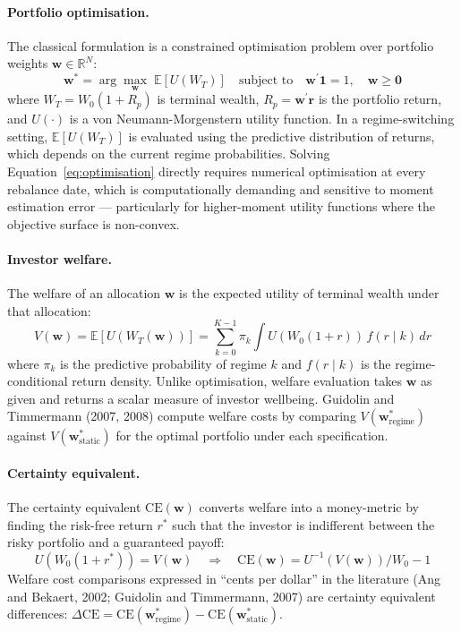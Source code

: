 \documentclass[12pt, a4paper]{article}
\begin{document}
\paragraph*{Portfolio optimisation.}
The classical formulation is a constrained optimisation problem over portfolio weights
$\mathbf{w} \in \mathbb{R}^N$:
\begin{equation}
  \mathbf{w}^* = \arg\max_{\mathbf{w}} \;\mathbb{E}\!\left[U(W_T)\right]
  \quad \text{subject to} \quad
  \mathbf{w}^\prime \mathbf{1} = 1, \quad \mathbf{w} \geq \mathbf{0}
  \label{eq:optimisation}
\end{equation}
where $W_T = W_0(1 + R_p)$ is terminal wealth, $R_p = \mathbf{w}^\prime \mathbf{r}$ is the
portfolio return, and $U(\cdot)$ is a von Neumann-Morgenstern utility function. In a
regime-switching setting, $\mathbb{E}[U(W_T)]$ is evaluated using the predictive distribution
of returns, which depends on the current regime probabilities. Solving
Equation~\eqref{eq:optimisation} directly requires numerical optimisation at every rebalance
date, which is computationally demanding and sensitive to moment estimation error --- particularly
for higher-moment utility functions where the objective surface is non-convex.

\paragraph*{Investor welfare.}
The welfare of an allocation $\mathbf{w}$ is the expected utility of terminal wealth under
that allocation:
\begin{equation}
  V(\mathbf{w}) = \mathbb{E}\!\left[U(W_T(\mathbf{w}))\right]
               = \sum_{k=0}^{K-1} \pi_k \int U(W_0(1+r))\, f(r \mid k)\, dr
  \label{eq:welfare}
\end{equation}
where $\pi_k$ is the predictive probability of regime $k$ and $f(r \mid k)$ is the
regime-conditional return density. Unlike optimisation, welfare evaluation takes $\mathbf{w}$
as given and returns a scalar measure of investor wellbeing. Guidolin and Timmermann (2007,
2008) compute welfare costs by comparing $V(\mathbf{w}^*_{\text{regime}})$ against
$V(\mathbf{w}^*_{\text{static}})$ for the optimal portfolio under each specification.

\paragraph*{Certainty equivalent.}
The certainty equivalent $\text{CE}(\mathbf{w})$ converts welfare into a money-metric
by finding the risk-free return $r^*$ such that the investor is indifferent between the
risky portfolio and a guaranteed payoff:
\begin{equation}
  U\!\left(W_0(1 + r^*)\right) = V(\mathbf{w})
  \quad\Longrightarrow\quad
  \text{CE}(\mathbf{w}) = U^{-1}\!\left(V(\mathbf{w})\right) / W_0 - 1
  \label{eq:ce}
\end{equation}
Welfare cost comparisons expressed in ``cents per dollar'' in the literature (Ang and
Bekaert, 2002; Guidolin and Timmermann, 2007) are certainty equivalent differences:
$\Delta\text{CE} = \text{CE}(\mathbf{w}^*_{\text{regime}}) - \text{CE}(\mathbf{w}^*_{\text{static}})$.
\end{document}

